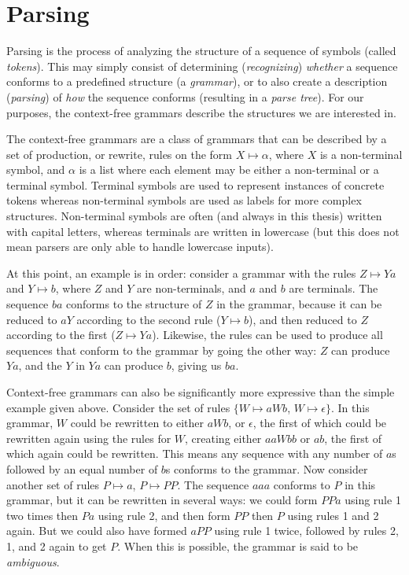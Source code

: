 
\chapter{Parsing} \label{Parsing}

	Parsing is the process of analyzing the structure of a sequence of symbols
	(called \emph{tokens}). This may simply consist of determining
	(\emph{recognizing}) \emph{whether} a sequence conforms to a predefined
	structure  (a \emph{grammar}), or to also
	create a description (\emph{parsing}) of \emph{how} the sequence conforms
	(resulting in a \emph{parse tree}).  For our purposes, the context-free
	grammars describe the structures we are interested in.

	The context-free grammars are a class of grammars that can be described by
	a set of production, or rewrite, rules on the form $X \mapsto \alpha$,
	where $X$ is a non-terminal symbol, and $\alpha$ is a list where each
	element may be either a non-terminal or a terminal symbol. Terminal symbols
	are used to represent instances of concrete tokens whereas non-terminal
	symbols are used as labels for more complex structures.
	Non-terminal symbols are often (and always in this thesis) written with
	capital letters, whereas terminals are written in lowercase (but this does
	not mean parsers are only able to handle lowercase inputs).

	At this point, an example is in order: consider a grammar with the rules $Z
	\mapsto Ya$ and $Y \mapsto b$, where $Z$ and $Y$ are non-terminals, and $a$
	and $b$ are terminals.  The sequence $ba$ conforms to the structure of $Z$
	in the grammar, because it can be reduced to $aY$ according to the second
	rule ($Y \mapsto b$), and then reduced to $Z$ according to the first ($Z
	\mapsto Ya$).  Likewise, the rules can be used to produce all sequences
	that conform to the grammar by going the other way: $Z$ can produce $Ya$,
	and the $Y$ in $Ya$ can produce $b$, giving us $ba$.

	Context-free grammars can also be significantly more expressive than the
	simple example given above. Consider the set of rules $\{W \mapsto aWb$, $W
	\mapsto \epsilon\}$. In this grammar, $W$ could be rewritten to either
	$aWb$, or $\epsilon$, the first of which could be rewritten again using the
	rules for $W$, creating either $aaWbb$ or $ab$, the first of which again
	could be rewritten. This means any sequence with any number of $a$s
	followed by an equal number of $b$s conforms to the grammar. Now consider
	another set of rules {$P \mapsto a$, $P \mapsto PP$}. The sequence $aaa$
	conforms to $P$ in this grammar, but it can be rewritten in several ways:
	we could form $PPa$ using rule 1 two times then $Pa$ using rule 2, and then
	form $PP$ then $P$ using rules 1 and 2 again. But we could also have formed
	$aPP$ using rule 1 twice, followed by rules 2, 1, and 2 again to get $P$.
	When this is possible, the grammar is said to be \emph{ambiguous}.

